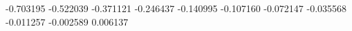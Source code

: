 -0.703195
-0.522039
-0.371121
-0.246437
-0.140995
-0.107160
-0.072147
-0.035568
-0.011257
-0.002589
0.006137
